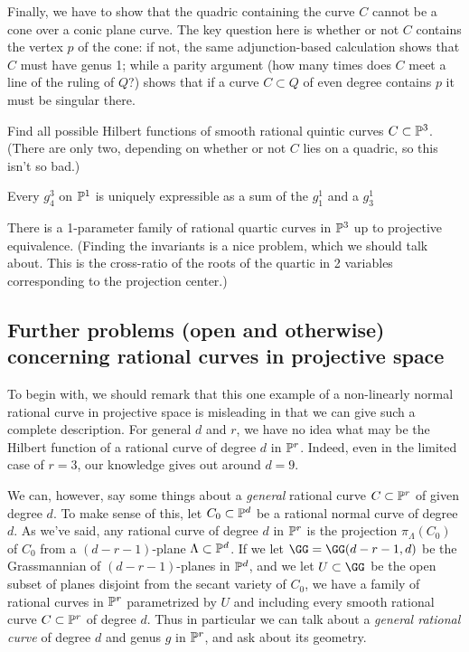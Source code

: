 
Finally, we have to show that the quadric containing the curve $C$ cannot be a cone over a conic plane curve. The key question here is whether or not $C$ contains the vertex $p$ of the cone: if not, the same adjunction-based calculation shows that $C$ must have genus 1; while a parity argument (how many times does $C$ meet a line of the ruling of $Q$?) shows that if a curve $C \subset Q$ of even degree contains $p$ it must be singular there.


\begin{exercise}
Find all possible Hilbert functions of smooth rational quintic  curves $C \subset \PP^3$. (There are only two, depending on whether or not $C$ lies on a quadric, so this isn't so bad.)
\end{exercise}

\begin{exercise}
Every $g^3_4$ on $\PP^1$ is uniquely expressible as a sum of the $g_1^1$ and a $g^1_3$
\end{exercise}

\begin{exercise}
There is a 1-parameter family of rational quartic curves in $\PP^3$ up to projective equivalence. (Finding the invariants is a nice problem, which we should talk about. This is the cross-ratio of the roots of the quartic in 2 variables corresponding to the projection center.)
\end{exercise}

\subsection{Further problems (open and otherwise) concerning rational curves in projective space}

To begin with, we should remark that this one example of a non-linearly normal rational curve in projective space is misleading in that we can give such a complete description. For general $d$ and $r$, we have no idea what may be the Hilbert function of a rational curve of degree $d$ in $\PP^r$. Indeed, even in the limited case of $r=3$, our knowledge gives out around $d=9$.

We can, however, say some things about a \emph{general} rational curve $C \subset \PP^r$ of given degree $d$. To make sense of this, let $C_0 \subset \PP^d$ be a rational normal curve of degree $d$. As we've said, any rational curve of degree $d$ in $\PP^r$ is the projection $\pi_\Lambda(C_0)$ of $C_0$ from a $(d-r-1)$-plane $\Lambda \subset \PP^d$. If we let $\GG = \GG(d-r-1, d)$ be the Grassmannian of $(d-r-1)$-planes in $\PP^d$, and we let $U \subset \GG$ be the open subset of planes disjoint from the secant variety of $C_0$, we have a family of rational curves in $\PP^r$ parametrized by $U$ and including every smooth rational curve $C \subset \PP^r$ of degree $d$. Thus in particular we can talk about a \emph{general rational curve} of degree $d$ and genus $g$ in $\PP^r$, and ask about its geometry.

